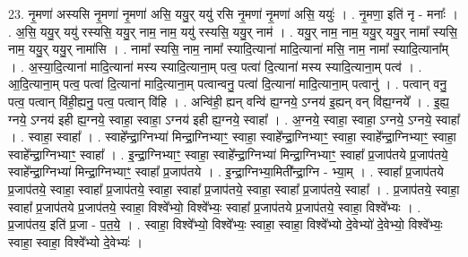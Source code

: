 \documentclass[17pt]{extarticle}
\begin{document}
23. नृ॒मणा॑ अस्यसि नृ॒मणा॑ नृ॒मणा॑ असि॒ ययु॒र् ययु॑ रसि नृ॒मणा॑ नृ॒मणा॑ असि॒ ययुः॑ । . नृ॒मणा॒ इति॑ नृ - मनाः᳚ । . अ॒सि॒ ययु॒र् ययु॑ रस्यसि॒ ययु॒र् नाम॒ नाम॒ ययु॑ रस्यसि॒ ययु॒र् नाम॑ । . ययु॒र् नाम॒ नाम॒ ययु॒र् ययु॒र् नामा᳚ स्यसि॒ नाम॒ ययु॒र् ययु॒र् नामा॑सि । . नामा᳚ स्यसि॒ नाम॒ नामा᳚ स्यादि॒त्याना॑ मादि॒त्याना॑ मसि॒ नाम॒ नामा᳚ स्यादि॒त्याना᳚म् । . अ॒स्या॒दि॒त्याना॑ मादि॒त्याना॑ मस्य स्यादि॒त्याना॒म् पत्व॒ पत्वा॑ दि॒त्याना॑ मस्य स्यादि॒त्याना॒म् पत्व॑ । . आ॒दि॒त्याना॒म् पत्व॒ पत्वा॑ दि॒त्याना॑ मादि॒त्याना॒म् पत्वान्वनु॒ पत्वा॑ दि॒त्याना॑ मादि॒त्याना॒म् पत्वानु॑ । . पत्वान् वनु॒ पत्व॒ पत्वान् वि॑ही॒ह्यनु॒ पत्व॒ पत्वान् वि॑हि । . अन्वि॑ही॒ ह्यन् वन्वि॑ ह्य॒ग्नये॒ ऽग्नय॑ इ॒ह्यन् वन् वि॑ह्य॒ग्नये᳚ । . इ॒ह्य॒ ग्नये॒ ऽग्नय॑ इही ह्य॒ग्नये॒ स्वाहा॒ स्वाहा॒ ऽग्नय॑ इही ह्य॒ग्नये॒ स्वाहा᳚ । . अ॒ग्नये॒ स्वाहा॒ स्वाहा॒ ऽग्नये॒ ऽग्नये॒ स्वाहा᳚ । . स्वाहा॒ स्वाहा᳚ । . स्वाहे᳚न्द्रा॒ग्निभ्या॑ मिन्द्रा॒ग्निभ्याꣳ॒॒ स्वाहा॒ स्वाहे᳚न्द्रा॒ग्निभ्याꣳ॒॒ स्वाहा॒ स्वाहे᳚न्द्रा॒ग्निभ्याꣳ॒॒ स्वाहा॒ स्वाहे᳚न्द्रा॒ग्निभ्याꣳ॒॒ स्वाहा᳚ । . इ॒न्द्रा॒ग्निभ्याꣳ॒॒ स्वाहा॒ स्वाहे᳚न्द्रा॒ग्निभ्या॑ मिन्द्रा॒ग्निभ्याꣳ॒॒ स्वाहा᳚ प्र॒जाप॑तये प्र॒जाप॑तये॒ 
स्वाहे᳚न्द्रा॒ग्निभ्या॑ मिन्द्रा॒ग्निभ्याꣳ॒॒ स्वाहा᳚ प्र॒जाप॑तये । . इ॒न्द्रा॒ग्निभ्या॒मिती᳚न्द्रा॒ग्नि - भ्या॒म् । . स्वाहा᳚ प्र॒जाप॑तये प्र॒जाप॑तये॒ स्वाहा॒ स्वाहा᳚ प्र॒जाप॑तये॒ स्वाहा॒ स्वाहा᳚ प्र॒जाप॑तये॒ स्वाहा॒ स्वाहा᳚ प्र॒जाप॑तये॒ स्वाहा᳚ । . प्र॒जाप॑तये॒ स्वाहा॒ स्वाहा᳚ प्र॒जाप॑तये प्र॒जाप॑तये॒ स्वाहा॒ विश्वे᳚भ्यो॒ विश्वे᳚भ्यः॒ स्वाहा᳚ प्र॒जाप॑तये प्र॒जाप॑तये॒ स्वाहा॒ विश्वे᳚भ्यः । . प्र॒जाप॑तय॒ इति॑ प्र॒जा - प॒त॒ये॒ । . स्वाहा॒ विश्वे᳚भ्यो॒ विश्वे᳚भ्यः॒ स्वाहा॒ स्वाहा॒ विश्वे᳚भ्यो दे॒वेभ्यो॑ दे॒वेभ्यो॒ विश्वे᳚भ्यः॒ स्वाहा॒ स्वाहा॒ विश्वे᳚भ्यो दे॒वेभ्यः॑ । \newline
\end{document}
